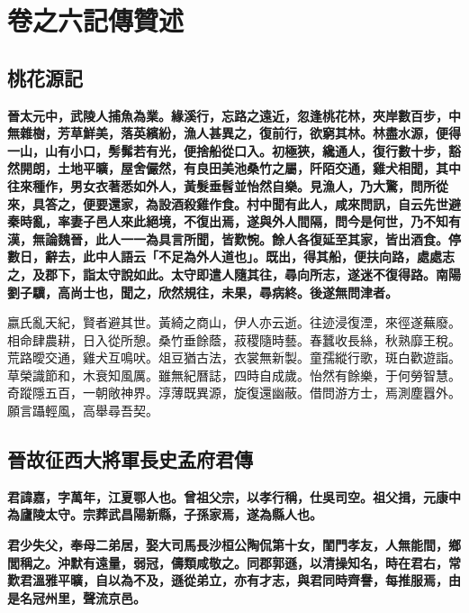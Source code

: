 \chapter{卷之六\hspace{1ex}記傳贊述}

\section{桃花源記\hspace{1ex}{\footnotesize 并詩}}

\textbf{晉太元中，武陵人捕魚為業。緣溪行，忘路之遠近，忽逢桃花林，夾岸數百步，中無雜樹，芳草鮮美，落英繽紛，漁人甚異之，復前行，欲窮其林。林盡水源，便得一山，山有小口，髣髴若有光，便捨船從口入。初極狹，纔通人，復行數十步，豁然開朗，土地平曠，屋舍儼然，有良田美池桑竹之屬，阡陌交通，雞犬相聞，其中往來種作，男女衣著悉如外人，黃髮垂髫並怡然自樂。見漁人，乃大驚，問所從來，具答之，便要還家，為設酒殺雞作食。村中聞有此人，咸來問訊，自云先世避秦時亂，率妻子邑人來此絕境，不復出焉，遂與外人間隔，問今是何世，乃不知有漢，無論魏晉，此人一一為具言所聞，皆歎惋。餘人各復延至其家，皆出酒食。停數日，辭去，此中人語云「不足為外人道也」。既出，得其船，便扶向路，處處志之，及郡下，詣太守說如此。太守即遣人隨其往，尋向所志，遂迷不復得路。南陽劉子驥，高尚士也，聞之，欣然規往，未果，尋病終。後遂無問津者。}

\begin{quoting}嬴氏亂天紀，賢者避其世。黃綺之商山，伊人亦云逝。往迹浸復湮，來徑遂蕪廢。相命肆農耕，日入從所憩。桑竹垂餘蔭，菽稷隨時藝。春蠶收長絲，秋熟靡王稅。荒路曖交通，雞犬互鳴吠。俎豆猶古法，衣裳無新製。童孺縱行歌，斑白歡遊詣。草榮識節和，木衰知風厲。雖無紀曆誌，四時自成歲。怡然有餘樂，于何勞智慧。奇蹤隱五百，一朝敞神界。淳薄既異源，旋復還幽蔽。借問游方士，焉測塵囂外。願言躡輕風，高舉尋吾契。\end{quoting}

\section{晉故征西大將軍長史孟府君傳}

\textbf{君諱嘉，字萬年，江夏鄂人也。曾祖父宗，以孝行稱，仕吳司空。祖父揖，元康中為廬陵太守。宗葬武昌陽新縣，子孫家焉，遂為縣人也。}

\textbf{君少失父，奉母二弟居，娶大司馬長沙桓公陶侃第十女，閨門孝友，人無能間，鄉閭稱之。沖默有遠量，弱冠，儔類咸敬之。同郡郭遜，以清操知名，時在君右，常歎君溫雅平曠，自以為不及，遜從弟立，亦有才志，與君同時齊譽，每推服焉，由是名冠州里，聲流京邑。}

